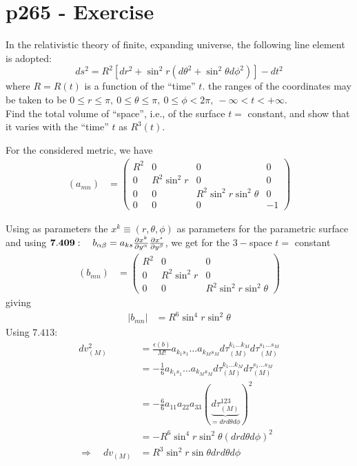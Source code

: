 \section{p265 - Exercise}
\begin{tcolorbox}
In the relativistic theory of finite, expanding universe, the following line element is adopted:
$$ds^2=R^2\left[dr^2+\sin^2 r\left(d\theta^2+\sin^2\theta d\phi^2\right)\right]-dt^2$$
where $R=R(t)$ is a function of the ``time'' $t$. the ranges of the coordinates may be taken to be $0\leq r\leq \pi, \ 0 \leq \theta \leq \pi,\ 0 \leq \phi< 2\pi,\ -\infty < t < + \infty$.\\
Find the total volume of ``space'', i.e., of the surface $t=$ constant, and show that it varies with the ``time'' $t$ as $R^3(t)$.
\end{tcolorbox}
For the considered metric, we have
\begin{align}
\left(a_{mn}\right)&= \left(\begin{array}{llll}
R^2&0&0&0\\
0&R^2\sin^2r&0&0\\
0&0&R^2\sin^2 r\sin^2\theta&0\\
0&0&0&-1
\end{array}\right)
\end{align}

Using as parameters the $x^k \equiv(r,\theta,\phi)$ as parameters for the parametric surface and using $\mathbf{7.409}:\quad b_{\alpha\beta}= a_{ks}\pdv{x^k}{y^{\alpha}}\pdv{x^s}{y^{\beta}} $, we get for the $3-$space $t=$ constant
\begin{align}
\left(b_{mn}\right)&= \left(\begin{array}{lll}
R^2&0&0\\
0&R^2\sin^2r&0\\
0&0&R^2\sin^2 r\sin^2\theta
\end{array}\right)
\end{align}
giving 
\begin{align}
\left|b_{mn}\right| &= R^6\sin^4 r\sin^2\theta
\end{align}
Using $\mathbf{7.413}$:
\begin{align}
dv_{(M)}^2&= \frac{\epsilon (b)}{M!}a_{k_1s_1}\dots a_{k_M s_M}d\tau_{(M)}^{k_1\dots k_M}d\tau_{(M)}^{s_1\dots s_M}\\
&= -\frac{1}{6}a_{k_1s_1}\dots a_{k_M s_M}d\tau_{(M)}^{k_1\dots k_M}d\tau_{(M)}^{s_1\dots s_M}\\
&= -\frac{6}{6}a_{11}a_{22}a_{33}\left(\underbrace{d\tau_{(M)}^{123}}_{=dr d\theta d\phi} \right)^2\\
&= -R^6\sin^4 r\sin^2\theta\left(dr d\theta d\phi \right)^2\\
\Rightarrow \quad dv_{(M)}&=R^3\sin^2 r\sin\theta dr d\theta d\phi
\end{align}



